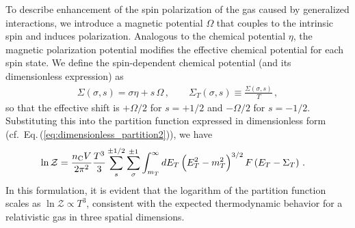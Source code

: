 \documentclass[epjST]{svjour}
\newcommand{\req}[1]{Eq.\,(\ref{#1})}
\begin{document}
{\color{blue}To describe enhancement of the spin polarization of the gas caused by generalized interactions, we introduce a magnetic potential \(\Omega\) that couples to the intrinsic spin and induces polarization. Analogous to the chemical potential \(\eta\), the magnetic polarization potential modifies the effective chemical potential for each spin state. We define the spin-dependent chemical potential (and its dimensionless expression) as
\begin{align}
\Sigma(\sigma,s) = \sigma\eta + s\,\Omega\,,\qquad \Sigma_{T}(\sigma,s)\equiv\frac{\Sigma(\sigma,s)}{T}\,,
\end{align}
so that the effective shift is \(+\Omega/2\) for \(s=+1/2\) and \(-\Omega/2\) for \(s=-1/2\). Substituting this into the partition function expressed in dimensionless form (cf.~\req{eq:dimensionless_partition2}), we have
\begin{align}
\label{eq:SpinPotentialPartition}
\ln\mathcal{Z} 
&= \frac{n_\mathrm{C} V}{2\pi^{2}} \frac{T^{3}}{3} 
\sum_{s}^{\pm1/2}\sum_{\sigma}^{\pm1} 
\int_{m_{T}}^{\infty} dE_{T} \, \Bigl(E_{T}^2 - m_{T}^2\Bigr)^{3/2}\,F\left(E_{T} - \Sigma_{T}\right)\,.
\end{align}
}In this formulation, it is evident that the logarithm of the partition function scales as \( \ln\mathcal{Z} \propto T^{3} \), consistent with the expected thermodynamic behavior for a relativistic gas in three spatial dimensions.


\end{document}
